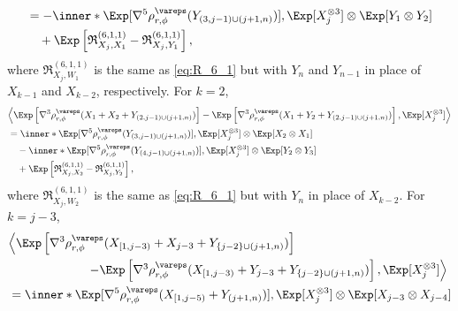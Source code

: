 \documentclass[aos]{imsart}
\begin{document}
\begin{appendix}
\begin{equation*}
\begin{aligned}
    & = - \inner*{
        \Exp[ \nabla^5 \rho_{r,\phi}^\vareps(Y_{(3,j-1) \cup (j+1,n)}) ],
        \Exp[ X_j^{\otimes 3} ] \otimes \Exp[ Y_1 \otimes Y_2 ]
    } \\
    & \quad + \Exp\left[ \mathfrak{R}_{X_j,X_1}^{(6,1,1)} - \mathfrak{R}_{X_j,Y_1}^{(6,1,1)} \right], \\
\end{aligned}
\end{equation*}
where $\mathfrak{R}_{X_j,W_1}^{(6,1,1)}$ is the same as \cref{eq:R_6_1} but with $Y_n$ and $Y_{n-1}$ in place of $X_{k-1}$ and $X_{k-2}$, respectively.
For $k = 2$,
\begin{equation*}
\begin{aligned}
    & \Big\langle
        \Exp\left[ \nabla^3 \rho_{r,\phi}^\vareps(X_1 + X_2 + Y_{(2,j-1) \cup (j+1,n)}) \right] 
    - \Exp\left[ \nabla^3   \rho_{r,\phi}^\vareps(X_1 + Y_2 + Y_{(2,j-1) \cup (j+1,n)}) \right], 
        \Exp[ X_j^{\otimes 3} ]
    \Big\rangle \\
    & = \inner*{
        \Exp[ \nabla^5 \rho_{r,\phi}^\vareps(Y_{(3,j-1) \cup (j+1,n)}) ],
        \Exp[ X_j^{\otimes 3} ] \otimes \Exp[ X_2 \otimes X_1 ]
    } \\
    & \quad - \inner*{
        \Exp[ \nabla^5 \rho_{r,\phi}^\vareps(Y_{(4,j-1) \cup (j+1,n)}) ],
        \Exp[ X_j^{\otimes 3} ] \otimes \Exp[ Y_2 \otimes Y_3 ]
    } \\
    & \quad + \Exp\left[ \mathfrak{R}_{X_j,X_2}^{(6,1,1)} - \mathfrak{R}_{X_j,Y_2}^{(6,1,1)} \right], \\
\end{aligned}
\end{equation*}
where $\mathfrak{R}_{X_j,W_2}^{(6,1,1)}$ is the same as \cref{eq:R_6_1} but with $Y_n$ in place of $X_{k-2}$.
For $k = j-3$,
\begin{equation*}
\begin{aligned}
    & \Big\langle
        \Exp\left[ \nabla^3 \rho_{r,\phi}^\vareps(X_{[1,j-3)} + X_{j-3} + Y_{\{j-2\} \cup (j+1,n)}) \right] \\ 
    & \omit{\hfill $- \Exp\left[ \nabla^3   \rho_{r,\phi}^\vareps(X_{[1,j-3)} + Y_{j-3} + Y_{\{j-2\} \cup (j+1,n)}) \right], 
        \Exp[ X_j^{\otimes 3} ]
    \Big\rangle$} \\
    & = \inner*{
        \Exp[ \nabla^5 \rho_{r,\phi}^\vareps(X_{[1,j-5)} + Y_{(j+1,n)}) ],
        \Exp[ X_j^{\otimes 3} ] \otimes \Exp[ X_{j-3} \otimes X_{j-4} ]
}
\end{aligned}
\end{equation*}
\end{appendix}
\end{document}
